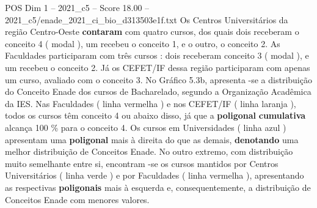 \begin{textsample}{POS Dim 1 – 2021\_c5 – Score 18.00 – 2021\_c5/enade\_2021\_ci\_bio\_d313503e1f.txt}
Os Centros Universitários da região Centro-Oeste \textbf{contaram} com quatro cursos, dos quais dois receberam o conceito 4 ( modal ), um recebeu o conceito 1, e o outro, o conceito 2.
As Faculdades participaram com três cursos : dois receberam conceito 3 ( modal ), e um recebeu o conceito 2.
Já os CEFET/IF dessa região participaram com apenas um curso, avaliado com o conceito 3.
No Gráfico 5.3b, apresenta -se a distribuição do Conceito Enade dos cursos de Bacharelado, segundo a Organização Acadêmica da IES.
Nas Faculdades ( linha vermelha ) e nos CEFET/IF ( linha laranja ), todos os cursos têm conceito 4 ou abaixo disso, já que a \textbf{poligonal} \textbf{cumulativa} alcança 100 \% para o conceito 4.
Os cursos em Universidades ( linha azul ) apresentam uma \textbf{poligonal} mais à direita do que as demais, \textbf{denotando} uma melhor distribuição de Conceitos Enade.
No outro extremo, com distribuição muito semelhante entre si, encontram -se os cursos mantidos por Centros Universitários ( linha verde ) e por Faculdades ( linha vermelha ), apresentando as respectivas \textbf{poligonais} mais à esquerda e, consequentemente, a distribuição de Conceitos Enade com menores valores.

\end{textsample}
